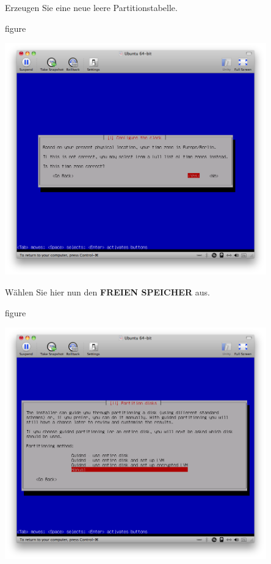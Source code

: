 Erzeugen Sie eine neue leere Partitionstabelle.

\begin{nofloat}{figure}
\begin{center}
\includegraphics[width=0.85\textwidth]{screenshots/09_ubuntu_install.png}
\end{center}
\end{nofloat}

\pagebreak
Wählen Sie hier nun den \textbf{FREIEN SPEICHER} aus.

\begin{nofloat}{figure}
\begin{center}
\includegraphics[width=0.85\textwidth]{screenshots/10_ubuntu_install.png}
\end{center}
\end{nofloat}

